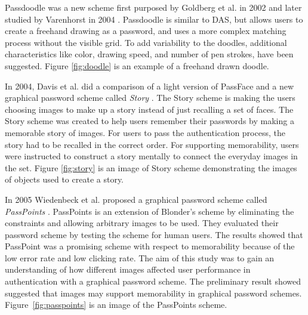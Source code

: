  Passdoodle was a new scheme first purposed by Goldberg et al. in 2002 and later studied by Varenhorst in 2004 \cite{PassDoodle,Varenhorst}. Passdoodle is similar to DAS, but allows users to create a freehand drawing as a password, and uses a more complex matching process without the visible grid. To add variability to the doodles, additional characteristics like color, drawing speed, and number of pen strokes, have been suggested. Figure \ref{fig:doodle} is an example of a freehand drawn doodle.

  In 2004, Davis et al. did a comparison of a light version of PassFace and a new graphical password scheme called {\it Story} \cite{Davis}. The Story scheme is making the users choosing images to make up a story instead of just recalling a set of faces. The Story scheme was created to help users remember their passwords by making a memorable story of images. For users to pass the authentication process, the story had to be recalled in the correct order. For supporting memorability, users were instructed to construct a story mentally to connect the everyday images in the set. Figure \ref{fig:story} is an image of Story scheme demonstrating the images of objects used to create a story.

  In 2005 Wiedenbeck et al. proposed a graphical password scheme called {\it PassPoints} \cite{Wiedenbeck2}. PassPoints is an extension of Blonder's \cite{Blonder} scheme by eliminating the constraints and allowing arbitrary images to be used. They evaluated their password scheme by testing the scheme for human users. The results showed that PassPoint was a promising scheme with respect to memorability because of the low error rate and low clicking rate. The aim of this study was to gain an understanding of how different images affected user performance in authentication with a graphical password scheme. The preliminary result showed suggested that images may support memorability in graphical password schemes. Figure~\ref{fig:passpoints} is an image of the PassPoints scheme.

